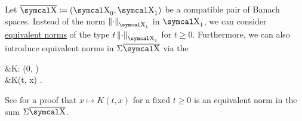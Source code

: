 \begin{definition}\label{def:k_functional}
  Let \( \Ol{\CX} \coloneqq ( \CX_0, \CX_1 ) \) be a compatible pair of Banach spaces. Instead of the norm \( \Norm{\cdot}_{\CX_1} \) in \( \CX_1 \), we can consider \hyperref[def:equivalent_metrics]{equivalent norms} of the type \( t\Norm{\cdot}_{\CX_1} \) for \( t \geq 0 \). Furthermore, we can also introduce equivalent norms in \( \Sigma \Ol{\CX} \) via the 
  \begin{AlignedEquation}\label{eq:def:k_functional}
    &K: (0, \infty) \times {\Sigma \Ol{\CX}} \\
    &K(t, x) \coloneqq \inf {}.
  \end{AlignedEquation}

  See  for a proof that \( x \mapsto K(t, x) \) for a fixed \( t \geq 0 \) is an equivalent norm in the sum \( \Sigma \Ol{\CX} \).
\end{definition}

